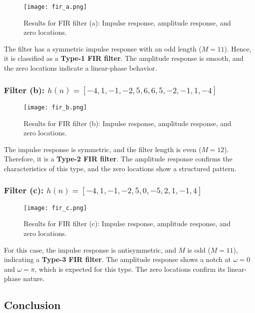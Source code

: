 \documentclass[a4paper,12pt]{article}
\begin{document}
\begin{figure}[H]
    \centering
    \texttt{[image: fir\_a.png]}
    \caption{Results for FIR filter (a): Impulse response, amplitude response, and zero locations.}
\end{figure}

The filter has a symmetric impulse response with an odd length (\( M=11 \)). Hence, it is classified as a \textbf{Type-1 FIR filter}. The amplitude response is smooth, and the zero locations indicate a linear-phase behavior.

\subsubsection{Filter (b): \( h(n) = [-4, 1, -1, -2, 5, 6, 6, 5, -2, -1, 1, -4] \)}

\begin{figure}[H]
    \centering
    \texttt{[image: fir\_b.png]}
    \caption{Results for FIR filter (b): Impulse response, amplitude response, and zero locations.}
\end{figure}

The impulse response is symmetric, and the filter length is even (\( M=12 \)). Therefore, it is a \textbf{Type-2 FIR filter}. The amplitude response confirms the characteristics of this type, and the zero locations show a structured pattern.

\subsubsection{Filter (c): \( h(n) = [-4, 1, -1, -2, 5, 0, -5, 2, 1, -1, 4] \)}

\begin{figure}[H]
    \centering
    \texttt{[image: fir\_c.png]}
    \caption{Results for FIR filter (c): Impulse response, amplitude response, and zero locations.}
\end{figure}

For this case, the impulse response is antisymmetric, and \( M \) is odd (\( M=11 \)), indicating a \textbf{Type-3 FIR filter}. The amplitude response shows a notch at \( \omega = 0 \) and \( \omega = \pi \), which is expected for this type. The zero locations confirm its linear-phase nature.

\subsection{Conclusion}
\end{document}
